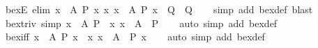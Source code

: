 \begin{isabellebody}
\ bex{}E\ {\isacharbrackleft}{\kern0pt}elim{\isacharbang}{\kern0pt}{\isacharbrackright}{\kern0pt}{\isacharcolon}{\kern0pt}\ {\isachardoublequoteopen}{\isasymlbrakk}{\isasymexists}{\isacharbang}{\kern0pt}x\ {\isasymin}\ A{\isachardot}{\kern0pt}\ P\ x{\isacharsemicolon}{\kern0pt}\ {\isasymAnd}x{\isachardot}{\kern0pt}\ {\isasymlbrakk}x\ {\isasymin}\ A{\isacharsemicolon}{\kern0pt}\ P\ x{\isasymrbrakk}\ {\isasymLongrightarrow}\ Q{\isasymrbrakk}\ {\isasymLongrightarrow}\ Q{\isachardoublequoteclose}\isanewline
%
\isadelimproof
\ \ %
\endisadelimproof
%
\isatagproof
{}\isamarkupfalse%
\ {\isacharparenleft}{\kern0pt}simp\ add{\isacharcolon}{\kern0pt}\ bex{}{\isacharunderscore}{\kern0pt}def{\isacharcomma}{\kern0pt}\ blast{\isacharparenright}{\kern0pt}%
\endisatagproof
{\isafoldproof}%
%
\isadelimproof
\isanewline
%
\endisadelimproof
\isanewline
{}\isamarkupfalse%
\ bex{}{\isacharunderscore}{\kern0pt}triv\ {\isacharbrackleft}{\kern0pt}simp{\isacharbrackright}{\kern0pt}{\isacharcolon}{\kern0pt}\ {\isachardoublequoteopen}{\isacharparenleft}{\kern0pt}{\isasymexists}{\isacharbang}{\kern0pt}x\ {\isasymin}\ A{\isachardot}{\kern0pt}\ P{\isacharparenright}{\kern0pt}\ {\isasymlongleftrightarrow}\ {\isacharparenleft}{\kern0pt}{\isacharparenleft}{\kern0pt}{\isasymexists}{\isacharbang}{\kern0pt}x{\isachardot}{\kern0pt}\ x\ {\isasymin}\ A{\isacharparenright}{\kern0pt}\ {\isasymand}\ P{\isacharparenright}{\kern0pt}{\isachardoublequoteclose}\isanewline
%
\isadelimproof
\ \ %
\endisadelimproof
%
\isatagproof
{}\isamarkupfalse%
\ {\isacharparenleft}{\kern0pt}auto\ simp\ add{\isacharcolon}{\kern0pt}\ bex{}{\isacharunderscore}{\kern0pt}def{\isacharparenright}{\kern0pt}%
\endisatagproof
{\isafoldproof}%
%
\isadelimproof
\isanewline
%
\endisadelimproof
\isanewline
{}\isamarkupfalse%
\ bex{}{\isacharunderscore}{\kern0pt}iff{\isacharcolon}{\kern0pt}\ {\isachardoublequoteopen}{\isacharparenleft}{\kern0pt}{\isasymexists}{\isacharbang}{\kern0pt}x\ {\isasymin}\ A{\isachardot}{\kern0pt}\ P\ x{\isacharparenright}{\kern0pt}\ {\isasymlongleftrightarrow}\ {\isacharparenleft}{\kern0pt}{\isasymexists}{\isacharbang}{\kern0pt}x{\isachardot}{\kern0pt}\ x\ {\isasymin}\ A\ {\isasymand}\ P\ x{\isacharparenright}{\kern0pt}{\isachardoublequoteclose}\isanewline
%
\isadelimproof
\ \ %
\endisadelimproof
%
\isatagproof
{}\isamarkupfalse%
\ {\isacharparenleft}{\kern0pt}auto\ simp\ add{\isacharcolon}{\kern0pt}\ bex{}{\isacharunderscore}{\kern0pt}def{\isacharparenright}{\kern0pt}%

\end{isabellebody}
